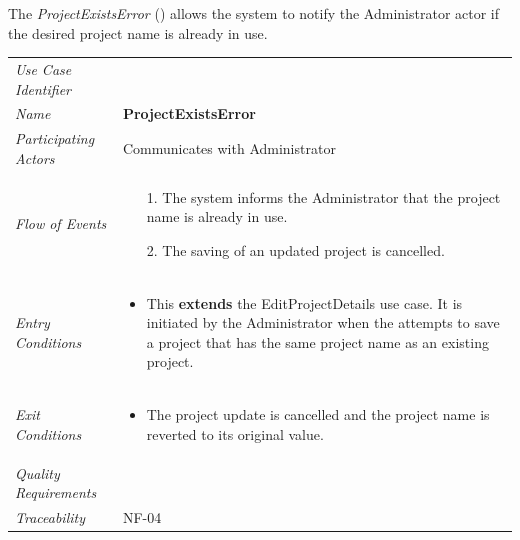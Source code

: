 \documentclass[12pt,letterpaper]{article}
\begin{document}
\newpage{}

The {\it ProjectExistsError} () allows the system to notify the Administrator actor if the desired project name is already in use.

\begin{center}
	\begin{tabu} to 
		\toprule
		Use Case Identifier &  \\
		Name & {\bf ProjectExistsError} \\
		Participating Actors & Communicates with Administrator \\
		Flow of Events & 
		\begin{minipage}[t]{\linewidth}
		    \begin{enumerate}
			    \item[1.] The system informs the Administrator that the project name is already in use.
			    \item[2.] The saving of an updated project is cancelled.
			\end{enumerate}
		\end{minipage} \\

		Entry Conditions &
		\begin{minipage}[t]{\linewidth}
			\begin{itemize}
			    \item This \textbf{extends} the EditProjectDetails use case. It is initiated by the Administrator when the attempts to save a project that has the same project name as an existing project.
	        \end{itemize}
		\end{minipage} \\

		Exit Conditions &
		\begin{minipage}[t]{\linewidth}
			\begin{itemize}
			    \item The project update is cancelled and the project name is reverted to its original value.
	        \end{itemize}
		\end{minipage} \\

		Quality Requirements & \\

		Traceability & NF-04 \\
		\toprule
	\end{tabu}
\end{center}
\end{document}
